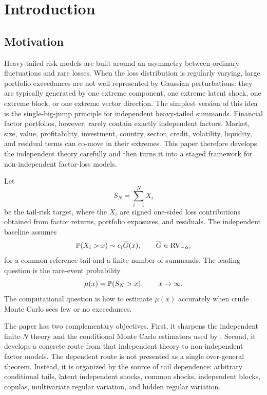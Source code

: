 \section{Introduction}
\label{sec:intro}

\subsection{Motivation}

Heavy-tailed risk models are built around an asymmetry between ordinary
fluctuations and rare losses. When the loss distribution is regularly varying,
large portfolio exceedances are not well represented by Gaussian perturbations:
they are typically generated by one extreme component, one extreme latent shock,
one extreme block, or one extreme vector direction. The simplest version of this
idea is the single-big-jump principle for independent heavy-tailed summands.
Financial factor portfolios, however, rarely contain exactly independent factors.
Market, size, value, profitability, investment, country, sector, credit,
volatility, liquidity, and residual terms can co-move in their extremes. This
paper therefore develops the independent theory carefully and then turns it into
a staged framework for non-independent factor-loss models.

Let
\[
  S_N=\sum_{i=1}^N X_i
\]
be the tail-risk target, where the $X_i$ are signed one-sided loss contributions
obtained from factor returns, portfolio exposures, and residuals. The independent
baseline assumes
\[
  \mathbb{P}(X_i>x)\sim c_i\overline{G}(x),\qquad \overline{G}\in \mathrm{RV}_{-\alpha},
\]
for a common reference tail and a finite number of summands. The leading question
is the rare-event probability
\[
  \mu(x)=\mathbb{P}(S_N>x),\qquad x\to\infty.
\]
The computational question is how to estimate $\mu(x)$ accurately when crude
Monte Carlo sees few or no exceedances.

The paper has two complementary objectives. First, it sharpens the independent
finite-$N$ theory and the conditional Monte Carlo estimators used by
\citet{PourbabaeeSolari2019}. Second, it develops a concrete route from that
independent theory to non-independent factor models. The dependent route is not
presented as a single over-general theorem. Instead, it is organized by the
source of tail dependence: arbitrary conditional tails, latent independent
shocks, common shocks, independent blocks, copulas, multivariate regular
variation, and hidden regular variation.

